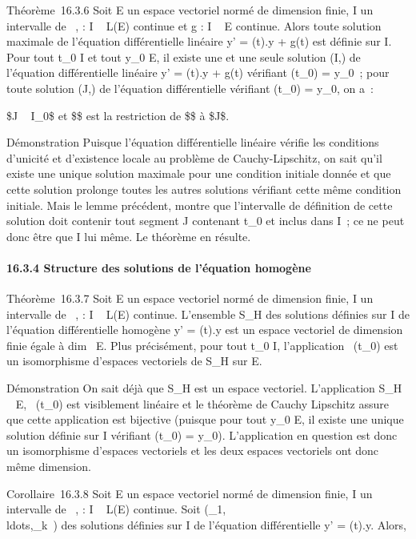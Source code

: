 \documentclass[]{article}
\begin{document}
Théorème~16.3.6 Soit E un espace vectoriel normé de dimension finie, I
un intervalle de ~, \ell : I \rightarrow~ L(E) continue et g : I \rightarrow~ E continue. Alors
toute solution maximale de l'équation différentielle linéaire y' =
\ell(t).y + g(t) est définie sur I. Pour tout t_0 \in I et tout
y_0 \in E, il existe une et une seule solution (I,\phi) de
l'équation différentielle linéaire y' = \ell(t).y + g(t) vérifiant
\phi(t_0) = y_0~; pour toute solution (J,\psi) de l'équation
différentielle vérifiant \psi(t_0) = y_0, on a~:

\text\$J \subset~ I_0\$ et \$\psi\$ est la restriction
de \$\phi\$ à \$J\$.

Démonstration Puisque l'équation différentielle linéaire vérifie les
conditions d'unicité et d'existence locale au problème de
Cauchy-Lipschitz, on sait qu'il existe une unique solution maximale pour
une condition initiale donnée et que cette solution prolonge toutes les
autres solutions vérifiant cette même condition initiale. Mais le lemme
précédent, montre que l'intervalle de définition de cette solution doit
contenir tout segment J contenant t_0 et inclus dans I~; ce ne
peut donc être que I lui même. Le théorème en résulte.

\paragraph{16.3.4 Structure des solutions de l'équation homogène}

Théorème~16.3.7 Soit E un espace vectoriel normé de dimension finie, I
un intervalle de ~, \ell : I \rightarrow~ L(E) continue. L'ensemble S_H des
solutions définies sur I de l'équation différentielle homogène y' =
\ell(t).y est un espace vectoriel de dimension finie égale à
dim~ E. Plus précisément, pour tout
t_0 \in I, l'application
\phi\mapsto~\phi(t_0) est un isomorphisme
d'espaces vectoriels de S_H sur E.

Démonstration On sait déjà que S_H est un espace vectoriel.
L'application S_H \rightarrow~ E,
\phi\mapsto~\phi(t_0) est visiblement linéaire et
le théorème de Cauchy Lipschitz assure que cette application est
bijective (puisque pour tout y_0 \in E, il existe une unique
solution définie sur I vérifiant \phi(t_0) = y_0).
L'application en question est donc un isomorphisme d'espaces vectoriels
et les deux espaces vectoriels ont donc même dimension.

Corollaire~16.3.8 Soit E un espace vectoriel normé de dimension finie, I
un intervalle de ~, \ell : I \rightarrow~ L(E) continue. Soit
(\phi_1,\\ldots,\phi_k~)
des solutions définies sur I de l'équation différentielle y' = \ell(t).y.
Alors,
\end{document}
